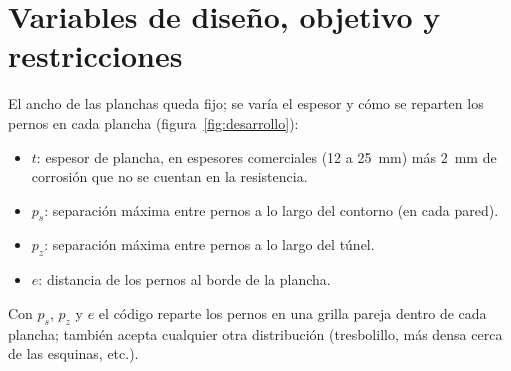 \documentclass[11pt]{article}
\begin{document}
\section{Variables de dise\~no, objetivo y restricciones}

El ancho de las planchas queda fijo; se var\'ia el espesor y c\'omo se reparten los pernos en cada
plancha (figura~\ref{fig:desarrollo}):

\begin{itemize}[leftmargin=1.3em, itemsep=2pt]
  \item $t$: espesor de plancha, en espesores comerciales (12 a 25~mm) m\'as 2~mm de corrosi\'on que no
        se cuentan en la resistencia.
  \item $p_s$: separaci\'on m\'axima entre pernos a lo largo del contorno (en cada pared).
  \item $p_z$: separaci\'on m\'axima entre pernos a lo largo del t\'unel.
  \item $e$: distancia de los pernos al borde de la plancha.
\end{itemize}
Con $p_s$, $p_z$ y $e$ el c\'odigo reparte los pernos en una grilla pareja dentro de cada plancha; tambi\'en
acepta cualquier otra distribuci\'on (tresbolillo, m\'as densa cerca de las esquinas, etc.).
\end{document}
